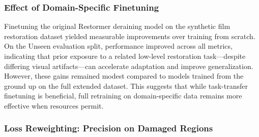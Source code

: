 \documentclass[10pt,a4paper,twocolumn,twoside]{article}
\begin{document}
\subsubsection{Effect of Domain-Specific Finetuning}

Finetuning the original Restormer deraining model on the synthetic film restoration dataset yielded measurable improvements over training from scratch. On the Unseen evaluation split, performance improved across all metrics, indicating that prior exposure to a related low-level restoration task—despite differing visual artifacts—can accelerate adaptation and improve generalization. However, these gains remained modest compared to models trained from the ground up on the full extended dataset. This suggests that while task-transfer finetuning is beneficial, full retraining on domain-specific data remains more effective when resources permit.
\subsubsection{Loss Reweighting: Precision on Damaged Regions}
\end{document}
